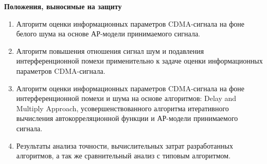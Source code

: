 {\bf{Положения, выносимые на защиту}}
\begin{enumerate}
	\item {Алгоритм оценки информационных параметров CDMA-сигнала на фоне белого шума на основе АР-модели принимаемого сигнала.}
	\item {Алгоритм повышения отношения сигнал шум и подавления интерференционной помехи применительно к задаче оценки информационных параметров CDMA-сигнала.}
	\item {Алгоритм оценки информационных параметров CDMA-сигнала на фоне интерференционной помехи и шума на основе алгоритмов: Delay and Multiply Approach,
		усовершенствованного алгоритма итеративного вычисления автокорреляционной функции и АР-модели принимаемого сигнала.}
	\item {Результаты анализа точности, вычислительных затрат разработанных алгоритмов, а так же сравнительный анализ с типовым алгоритмом.}
\end{enumerate}

\clearpage
